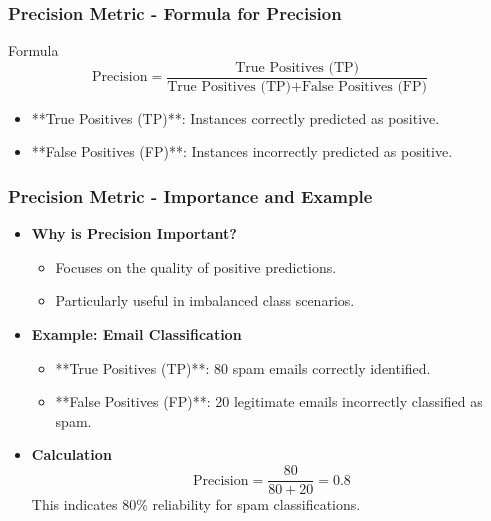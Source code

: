 \documentclass[aspectratio=169]{beamer}
\begin{document}
\begin{frame}[fragile]
    \frametitle{Precision Metric - Formula for Precision}
    \begin{block}{Formula}
        \begin{equation}
            \text{Precision} = \frac{\text{True Positives (TP)}}{\text{True Positives (TP)} + \text{False Positives (FP)}}
        \end{equation}
    \end{block}
    
    \begin{itemize}
        \item **True Positives (TP)**: Instances correctly predicted as positive.
        \item **False Positives (FP)**: Instances incorrectly predicted as positive.
    \end{itemize}
\end{frame}

\begin{frame}[fragile]
    \frametitle{Precision Metric - Importance and Example}
    \begin{itemize}
        \item \textbf{Why is Precision Important?}
            \begin{itemize}
                \item Focuses on the quality of positive predictions.
                \item Particularly useful in imbalanced class scenarios.
            \end{itemize}

        \item \textbf{Example: Email Classification}
            \begin{itemize}
                \item **True Positives (TP)**: 80 spam emails correctly identified.
                \item **False Positives (FP)**: 20 legitimate emails incorrectly classified as spam.
            \end{itemize}
        
        \item \textbf{Calculation}
            \begin{equation}
                \text{Precision} = \frac{80}{80 + 20} = 0.8
            \end{equation}
            This indicates 80\% reliability for spam classifications.
    \end{itemize}
\end{frame}
\end{document}
